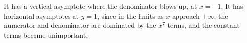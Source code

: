 It has a vertical asymptote where the denominator blows up, at $x=-1$.
It has horizontal asymptotes at $y=1$, since in the limits as
$x$ approach $\pm\infty$, the numerator and denominator are dominated
by the $x^7$ terms, and the constant terms become unimportant.
